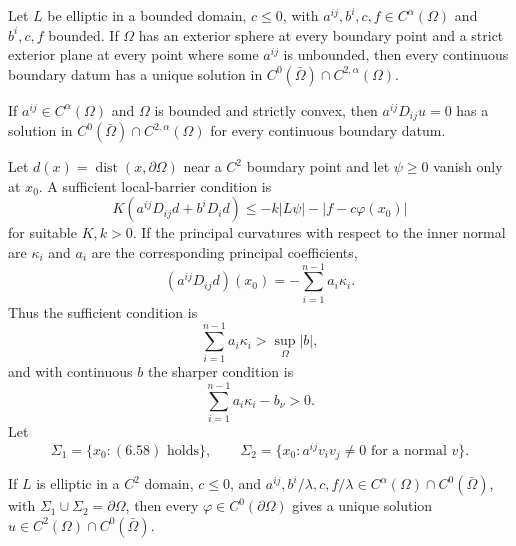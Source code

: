 \begin{theorem}
\label{gt-ch06-thm-6-24}
Let $L$ be elliptic in a bounded domain, $c\le0$, with
$a^{ij},b^i,c,f\in C^\alpha(\Omega)$ and $b^i,c,f$ bounded.  If $\Omega$ has
an exterior sphere at every boundary point and a strict exterior plane at every
point where some $a^{ij}$ is unbounded, then every continuous boundary datum
has a unique solution in $C^0(\bar\Omega)\cap C^{2,\alpha}(\Omega)$.
\end{theorem}

\begin{corollary}
\label{gt-ch06-cor-6-24-prime}
If $a^{ij}\in C^\alpha(\Omega)$ and $\Omega$ is bounded and strictly convex,
then $a^{ij}D_{ij}u=0$ has a solution in
$C^0(\bar\Omega)\cap C^{2,\alpha}(\Omega)$ for every continuous boundary datum.
\end{corollary}

Let $d(x)=\operatorname{dist}(x,\partial\Omega)$ near a $C^2$ boundary point
and let $\psi\ge0$ vanish only at $x_0$.  A sufficient local-barrier condition is
\begin{equation}\tag{6.55}
K(a^{ij}D_{ij}d+b^iD_i d)\le-k|L\psi|-|f-c\varphi(x_0)|
\end{equation}
for suitable $K,k>0$.  If the principal curvatures with respect to the inner
normal are $\kappa_i$ and $a_i$ are the corresponding principal coefficients,
\begin{equation}\tag{6.56}
(a^{ij}D_{ij}d)(x_0)=-\sum_{i=1}^{n-1}a_i\kappa_i.
\end{equation}
Thus the sufficient condition is
\begin{equation}
\tag{6.57}
\sum_{i=1}^{n-1}a_i\kappa_i>\sup_\Omega|b|,
\end{equation}
and with continuous $b$ the sharper condition is
\begin{equation}\tag{6.58}
\sum_{i=1}^{n-1}a_i\kappa_i-b_\nu>0.
\end{equation}
Let
\[
\Sigma_1=\{x_0:(6.58)\text{ holds}\},\qquad
\Sigma_2=\{x_0:a^{ij}v_i v_j\ne0\text{ for a normal }v\}.
\]

\begin{theorem}
\label{gt-ch06-thm-6-25}
If $L$ is elliptic in a $C^2$ domain, $c\le0$, and
$a^{ij},b^i/\lambda,c,f/\lambda\in C^\alpha(\Omega)\cap C^0(\bar\Omega)$,
with $\Sigma_1\cup\Sigma_2=\partial\Omega$, then every
$\varphi\in C^0(\partial\Omega)$ gives a unique solution
$u\in C^2(\Omega)\cap C^0(\bar\Omega)$.
\end{theorem}

